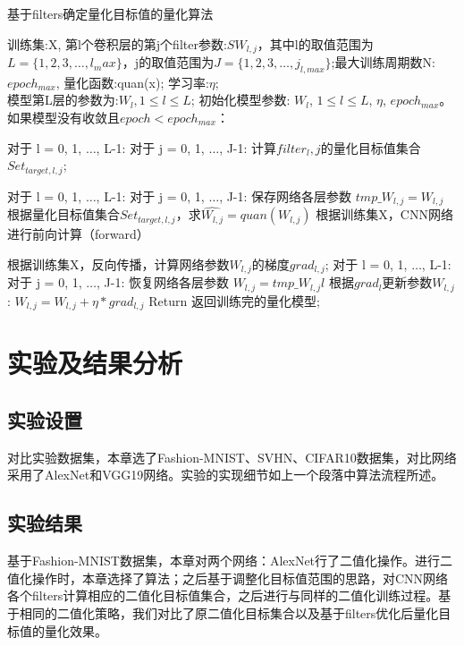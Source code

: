 \documentclass[ pdftex, oneside, master]{NJUthesis}
\begin{document}
\begin{algorithm}[htb]
  \caption{基于filters确定量化目标值的量化算法}
  \label{2training}
  \begin{algorithmic}[1]
    \REQUIRE
      训练集:X, 第l个卷积层的第j个filter参数:$SW_{l,j}$，其中l的取值范围为$L = \{1,2,3,\dots,l_max\}$，j的取值范围为$J = \{1,2,3,\dots,j_{l,max}\}$;最大训练周期数N: $epoch_{max}$,
      量化函数:quan(x); 学习率:$\eta$;
      \\
    \ENSURE 模型第L层的参数为:${W_l, 1\leq l\leq L}$;
    \STATE 初始化模型参数: ${W_l}$, ${1\leq l\leq L}$, $\eta$, $epoch_{max}$。
    \STATE 如果模型没有收敛且$epoch<epoch_{max}$：

    \STATE \qquad 对于 l = 0, 1, $\ldots$, L-1:
    \STATE \qquad \qquad 对于 j = 0, 1, $\ldots$, J-1:
    \STATE \qquad \qquad \qquad 计算${filter_l,j}$的量化目标值集合$Set_ {target,l,j}$;

    \STATE \qquad 对于 l = 0, 1, $\ldots$, L-1:
    \STATE \qquad \qquad 对于 j = 0, 1, $\ldots$, J-1:
    \STATE \qquad \qquad \qquad 保存网络各层参数 $tmp\_W_{l,j}=W_{l,j}$
    \STATE \qquad \qquad \qquad 根据量化目标值集合$Set_ {target,l,j}$，求$\hat{W_{l,j}}=quan(W_{l,j})$
    \STATE \qquad 根据训练集X，CNN网络进行前向计算（forward）

    \STATE \qquad 根据训练集X，反向传播，计算网络参数$W_{l,j}$的梯度$grad_{l,j}$;
    \STATE \qquad 对于 l = 0, 1, $\ldots$, L-1:
    \STATE \qquad \qquad 对于 j = 0, 1, $\ldots$, J-1:
    \STATE \qquad \qquad \qquad 恢复网络各层参数 $W_{l,j} = tmp\_W_{l,j}l$
    \STATE \qquad \qquad \qquad 根据$grad_l$更新参数$W_{l,j}$: $W_{l,j} = W_{l,j}+ \eta*grad_{l,j}$
    \STATE Return 返回训练完的量化模型;
  \end{algorithmic}
\end{algorithm}



\section{实验及结果分析}

\subsection{实验设置}
对比实验数据集，本章选了Fashion-MNIST、SVHN、CIFAR10数据集，对比网络采用了AlexNet和VGG19网络。实验的实现细节如上一个段落中算法流程所述。

\subsection{实验结果}
基于Fashion-MNIST数据集，本章对两个网络：AlexNet行了二值化操作。进行二值化操作时，本章选择了\cite{binary}算法；之后基于调整化目标值范围的思路，对CNN网络各个filters计算相应的二值化目标值集合，之后进行与\cite{binary}同样的二值化训练过程。基于相同的二值化策略\cite{binary}，我们对比了原二值化目标集合以及基于filters优化后量化目标值的量化效果。
\end{document}
